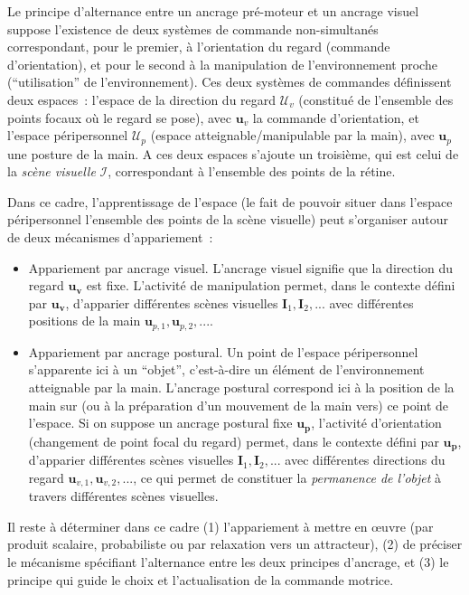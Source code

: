 \documentclass[11pt]{article}
\begin{document}
Le principe d'alternance entre un ancrage pré-moteur et un ancrage  visuel suppose l'existence de deux systèmes de commande non-simultanés correspondant, pour le premier, à l'orientation du regard (commande d'orientation), et pour le second à la manipulation de l'environnement proche (``utilisation'' de l'environnement).
Ces deux systèmes de commandes définissent deux espaces~: l'espace de la direction du regard $\mathcal{U}_v$ (constitué de l'ensemble des points focaux où le regard se pose), avec $\boldsymbol{u}_v$ la commande d'orientation, et l'espace péripersonnel $\mathcal{U}_p$ (espace atteignable/manipulable par la main), avec $\boldsymbol{u}_p$
une posture de la main. A ces deux espaces s'ajoute un troisième, qui est celui de la \textit{scène visuelle} $\mathcal{I}$, correspondant à l'ensemble des points de la rétine. 

Dans ce cadre, l'apprentissage de l'espace (le fait de pouvoir situer dans l'espace péripersonnel l'ensemble des points de la scène visuelle) peut s'organiser autour de deux mécanismes d'appariement~:
\begin{itemize}
	\item Appariement par ancrage visuel. L'ancrage visuel signifie que la direction du regard $\boldsymbol{u_v}$ est fixe. L'activité de manipulation permet, dans le contexte défini par $\boldsymbol{u_v}$, d'apparier différentes scènes visuelles $\boldsymbol{I}_1, \boldsymbol{I}_2, ...$ avec différentes positions de la main $\boldsymbol{u}_{p,1}, \boldsymbol{u}_{p,2}, ...$.
	\item Appariement par ancrage postural. Un point de l'espace péripersonnel s'apparente ici à un ``objet'', c'est-à-dire un élément de l'environnement atteignable par la main. L'ancrage postural correspond ici à la position de la main sur (ou à la préparation d'un mouvement de la main vers) ce point de l'espace. Si on suppose un ancrage postural fixe $\boldsymbol{u_p}$,  l'activité d'orientation (changement de point focal du regard)  permet, dans le contexte défini par $\boldsymbol{u_p}$, d'apparier différentes scènes visuelles $\boldsymbol{I}_1, \boldsymbol{I}_2, ...$ avec différentes directions du regard $\boldsymbol{u}_{v,1}, \boldsymbol{u}_{v,2}, ...$, ce qui permet de constituer la \textit{permanence de l'objet} à travers différentes scènes visuelles.  
\end{itemize}

Il reste à déterminer dans ce cadre (1) l'appariement à mettre en œuvre (par produit scalaire, probabiliste ou par relaxation vers un attracteur), (2) de préciser le mécanisme spécifiant l'alternance entre les deux principes d'ancrage, et (3) le principe qui guide le choix et l'actualisation de la commande motrice. 
\end{document}
